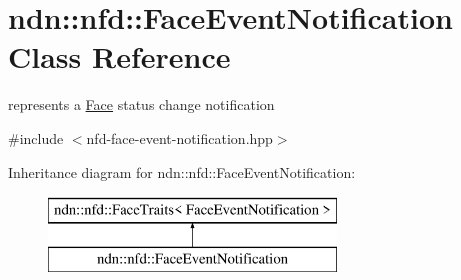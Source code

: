 \hypertarget{classndn_1_1nfd_1_1FaceEventNotification}{}\section{ndn\+:\+:nfd\+:\+:Face\+Event\+Notification Class Reference}
\label{classndn_1_1nfd_1_1FaceEventNotification}


represents a \hyperlink{classndn_1_1Face}{Face} status change notification  




{\ttfamily \#include $<$nfd-\/face-\/event-\/notification.\+hpp$>$}

Inheritance diagram for ndn\+:\+:nfd\+:\+:Face\+Event\+Notification\+:\begin{figure}[H]
\begin{center}
\leavevmode
\includegraphics[height=2.000000cm]{classndn_1_1nfd_1_1FaceEventNotification}
\end{center}
\end{figure}

